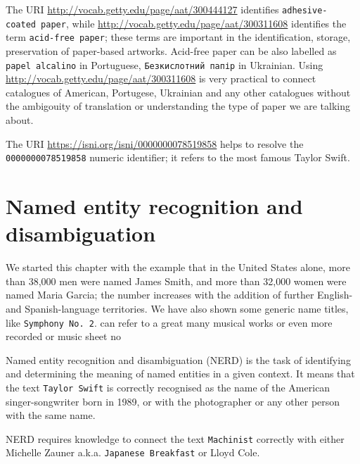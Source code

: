\documentclass[
  letterpaper,
  DIV=11,
  numbers=noendperiod]{scrreprt}
\begin{document}
The URI \url{http://vocab.getty.edu/page/aat/300444127} identifies
\texttt{adhesive-coated\ paper}, while
\url{http://vocab.getty.edu/page/aat/300311608} identifies the term
\texttt{acid-free\ paper}; these terms are important in the
identification, storage, preservation of paper-based artworks. Acid-free
paper can be also labelled as \texttt{papel\ alcalino} in Portuguese,
\texttt{Безкислотний\ папір} in Ukrainian. Using
\url{http://vocab.getty.edu/page/aat/300311608} is very practical to
connect catalogues of American, Portugese, Ukrainian and any other
catalogues without the ambigouity of translation or understanding the
type of paper we are talking about.

The URI \url{https://isni.org/isni/0000000078519858} helps to resolve
the \texttt{0000000078519858} numeric identifier; it refers to the most
famous Taylor Swift.

\section{Named entity recognition and disambiguation}\label{sec-nerd}

We started this chapter with the example that in the United States
alone, more than 38,000 men were named James Smith, and more than 32,000
women were named Maria Garcia; the number increases with the addition of
further English- and Spanish-language territories. We have also shown
some generic name titles, like \texttt{Symphony\ No.\ 2}. can refer to a
great many musical works or even more recorded or music sheet no

Named entity recognition and disambiguation (NERD) is the task of
identifying and determining the meaning of named entities in a given
context. It means that the text \texttt{Taylor\ Swift} is correctly
recognised as the name of the American singer-songwriter born in 1989,
or with the photographer or any other person with the same name.

NERD requires knowledge to connect the text \texttt{Machinist} correctly
with either Michelle Zauner a.k.a. \texttt{Japanese\ Breakfast} or Lloyd
Cole.
\end{document}
